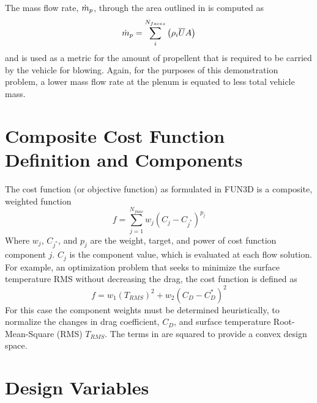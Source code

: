 The mass flow rate, $\dot{m}_p$,
through the area outlined in  is computed as
\begin{equation}
  \dot{m}_p = \sum_{i}^{N_{faces}}\left( \rho_i \overline{U} A \right)
  \label{mass-flow-eqn}
\end{equation}
and is used as a metric for the amount of propellent that is required to be
carried by the vehicle for blowing.  Again, for the purposes of this
demonstration problem, a lower mass flow rate at the plenum is equated to less
total vehicle mass.

\section{Composite Cost Function Definition and Components}
\label{cost-func-components}

The cost function (or objective function) as formulated in FUN3D is a composite,
weighted function
\begin{equation}
  f = \sum_{j=1}^{N_{func}}w_j\left( C_j - C_{j^*} \right)^{p_j}
  \label{generic-cost-function}
\end{equation}
Where $w_j$, $C_{j^*}$, and $p_j$ are the weight, target, and power of cost
function component $j$.  $C_j$ is the component value, which is evaluated at
each flow solution.  For example, an optimization problem that seeks to minimize the
surface temperature RMS without decreasing the drag, the cost function is
defined as 
\begin{equation}
  f = w_1\left( T_{RMS} \right)^{2} + w_2\left( C_{D} - C_{D}^{*} \right)^2
  \label{cd-tt-cost-function}
\end{equation}
For this case the component weights must be determined heuristically, to normalize
the changes in drag coefficient, $C_D$, and surface temperature Root-Mean-Square
(RMS) $T_{RMS}$.  The terms in  are squared to provide
a convex design space.

\section{Design Variables}


